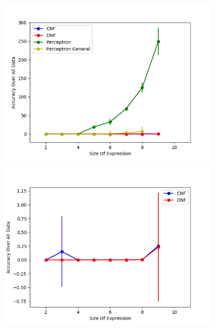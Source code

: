 \begin{figure}[H]
  \centering
  \begin{minipage}[b]{0.8\textwidth}
    \includegraphics[width=\textwidth]{All-Peformance-Comparason.png}
    \caption{}
    \label{fig:peformance-comparason-all}
  \end{minipage}
  \hfill
\end{figure}

\begin{figure}[H]
  \centering
  \begin{minipage}[b]{0.8\textwidth}
    \includegraphics[width=\textwidth]{CNFvsDNF.png}
    \caption{}
    \label{fig:peformance-comparason-cnfdnf}
  \end{minipage}
  \hfill
\end{figure}


